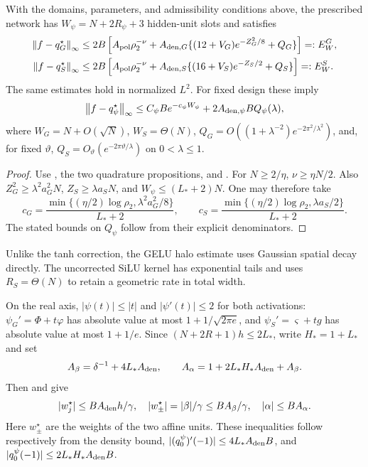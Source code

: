 \begin{theorem}
\label{thm:psi-witness}\label{thm:gelu-witness}\label{thm:silu-witness}
With the domains, parameters, and admissibility conditions above, the
prescribed network has $W_\psi=N+2R_\psi+3$ hidden-unit slots and satisfies
\begin{align}
 \left\lVert f-q_G^\star\right\rVert_\infty
 &\le 2B\left[A_{\rm pol}\rho_2^{-\nu}
       +A_{{\rm den},G}\{(12+V_G)e^{-Z_G^2/8}+Q_G\}\right]=:E_W^G,
 \label{eq:gelu-witness}\\
 \left\lVert f-q_S^\star\right\rVert_\infty
 &\le 2B\left[A_{\rm pol}\rho_2^{-\nu}
       +A_{{\rm den},S}\{(16+V_S)e^{-Z_S/2}+Q_S\}\right]=:E_W^S.
 \label{eq:silu-witness}
\end{align}
The same estimates hold in normalized $L^2$. For fixed design these imply
\begin{equation}
 \left\lVert f-q_\psi^\star\right\rVert_\infty
 \le C_\psi B e^{-c_\psi W_\psi}+2A_{{\rm den},\psi}B Q_\psi(\lambda),
 \label{eq:psi-rate}
\end{equation}
where $W_G=N+O(\sqrt N)$, $W_S=\Theta(N)$,
$Q_G=O((1+\lambda^{-2})e^{-2\pi^2/\lambda^2})$, and, for fixed
$\vartheta$, $Q_S=O_\vartheta(e^{-2\pi\vartheta/\lambda})$ on $0<\lambda\le1$.
\end{theorem}
\begin{proof}
Use , the two quadrature propositions, and
. For $N\ge2/\eta$, $\nu\ge\eta N/2$.
Also $Z_G^2\ge\lambda^2a_G^2N$, $Z_S\ge\lambda a_SN$, and
$W_\psi\le(L_*+2)N$. One may therefore take
\[
 c_G=\frac{\min\{(\eta/2)\log\rho_2,\lambda^2a_G^2/8\}}{L_*+2},\qquad
 c_S=\frac{\min\{(\eta/2)\log\rho_2,\lambda a_S/2\}}{L_*+2}.
\]
The stated bounds on $Q_\psi$ follow from their explicit denominators.
\end{proof}
Unlike the tanh correction, the GELU halo estimate uses Gaussian spatial
decay directly. The uncorrected SiLU kernel has exponential tails and uses
$R_S=\Theta(N)$ to retain a geometric rate in total width.

On the real axis, $|\psi(t)|\le|t|$ and $|\psi'(t)|\le2$ for both
activations: $\psi_G'=\Phi+t\varphi$ has absolute value at most
$1+1/\sqrt{2\pi e}$, and $\psi_S'=\varsigma+t g$ has absolute value at most
$1+1/e$. Since $(N+2R+1)h\le2L_*$, write $H_*=1+L_*$ and set
\begin{equation}
 A_\beta=\delta^{-1}+4L_*A_{\rm den},\qquad
 A_\alpha=1+2L_*H_*A_{\rm den}+A_\beta.
 \label{eq:psi-affine-envelopes}
\end{equation}
Then  and  give
\begin{equation}
 |w_j^\star|\le B A_{\rm den}h/\gamma,\quad
 |w_\pm^\star|=|\beta|/\gamma\le BA_\beta/\gamma,\quad
 |\alpha|\le BA_\alpha.
 \label{eq:psi-weight-envelope}
\end{equation}
Here $w_\pm^\star$ are the weights of the two affine units. These inequalities
follow respectively from the density bound,
$|(q_0^\psi)'(-1)|\le4L_*A_{\rm den}B$, and
$|q_0^\psi(-1)|\le2L_*H_*A_{\rm den}B$.

